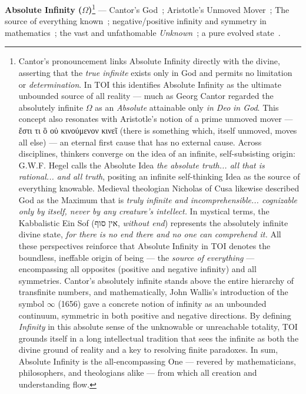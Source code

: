 \documentclass[11pt]{article}
\begin{document}
\textbf{Absolute Infinity (\( \Omega \))}\footnote{Cantor's pronouncement links Absolute Infinity directly with the divine, asserting that the \textit{true infinite} exists only in God and permits no limitation or \textit{determination}. In TOI this identifies Absolute Infinity as the ultimate unbounded source of all reality --- much as Georg Cantor regarded the absolutely infinite \( \Omega\) as an \textit{Absolute} attainable only \textit{in Deo} \textit{in God}. This concept also resonates with Aristotle's notion of a prime unmoved mover --- ἔστι τι ὃ οὐ κινούμενον κινεῖ (there is something which, itself unmoved, moves all else) --- an eternal first cause that has no external cause. Across disciplines, thinkers converge on the idea of an infinite, self-subsisting origin: G.W.F. Hegel calls the Absolute Idea \textit{the absolute truth... all that is rational... and all truth}, positing an infinite self-thinking Idea as the source of everything knowable. Medieval theologian Nicholas of Cusa likewise described God as the Maximum that is \textit{truly infinite and incomprehensible... cognizable only by itself, never by any creature's intellect.} In mystical terms, the Kabbalistic Ein Sof (אין סוף, \textit{without end}) represents the absolutely infinite divine state, \textit{for there is no end there and no one can comprehend it.} All these perspectives reinforce that Absolute Infinity in TOI denotes the boundless, ineffable origin of being --- the \textit{source of everything} --- encompassing all opposites (positive and negative infinity) and all symmetries. Cantor's absolutely infinite stands above the entire hierarchy of transfinite numbers, and mathematically, John Wallis's introduction of the symbol \(\infty\) (1656) gave a concrete notion of infinity as an unbounded continuum, symmetric in both positive and negative directions. By defining \textit{Infinity} in this absolute sense of the unknowable or unreachable totality, TOI grounds itself in a long intellectual tradition that sees the infinite as both the divine ground of reality and a key to resolving finite paradoxes. In sum, Absolute Infinity is the all-encompassing One --- revered by mathematicians, philosophers, and theologians alike --- from which all creation and understanding flow.}
\label{def:infinity} --- Cantor's God~\cite{cantor_absolute_infinity_1897}; Aristotle's Unmoved Mover~\cite{aristotle_metaphysics_1831}; The source of everything known~\cite{hegel_science_of_logic_1816}; negative/positive infinity and symmetry in mathematics~\cite{wallis_arithmetica_infinitorum_1656}; the vast and unfathomable \textit{Unknown}~\cite{cusanus_de_docta_ignorantia_1440}; a pure evolved state~\cite{zohar_1558}. 
\end{document}

